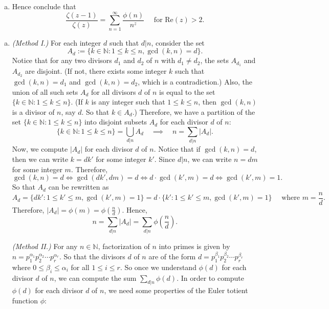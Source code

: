 \documentclass{elegantbook}
\begin{document}
\begin{problemset}[Exercises]
\begin{enumerate}[(a)]
\[            \]
    \item Hence conclude that
            \[
              \frac{\zeta(z-1)}{\zeta(z)} = \sum_{n=1}^{\infty} \frac{\phi(n)}{n^z} \quad \text{ for } \mathrm{Re}(z)>2.
            \]
  \end{enumerate}
  \begin{solution}
    \begin{enumerate}[(a)]
      \item \textit{(Method I.)} For each integer $d$ such that $d|n$, consider the set
      \[
        A_d := \{ k \in \mathbb{N} : 1 \leq k \leq n, \gcd(k,n) = d \}.
      \]
      Notice that for any two divisors $d_1$ and $d_2$ of $n$ with $d_1 \neq d_2$, the sets $A_{d_1}$ and $A_{d_2}$ are disjoint. (If not, there exists some integer $k$ such that $\gcd(k,n) = d_1$ and $\gcd(k,n) = d_2$, which is a contradiction.) Also, the union of all such sets $A_d$ for all divisors $d$ of $n$ is equal to the set $\{ k \in \mathbb{N} : 1 \leq k \leq n \}$. (If $k$ is any integer such that $1 \leq k \leq n$, then $\gcd(k,n)$ is a divisor of $n$, say $d$. So that $k \in A_d$.)
      Therefore, we have a partition of the set $\{ k \in \mathbb{N} : 1 \leq k \leq n \}$ into disjoint subsets $A_d$ for each divisor $d$ of $n$:
      \[
        \{ k \in \mathbb{N} : 1 \leq k \leq n \} = \bigcup_{d|n} A_d \quad \implies \quad n = \sum_{d|n} |A_d|.
      \]
      Now, we compute $|A_d|$ for each divisor $d$ of $n$. Notice that if $\gcd(k,n) = d$, then we can write $k = d k'$ for some integer $k'$. Since $d|n$, we can write $n = d m$ for some integer $m$. Therefore,
      \[
        \gcd(k,n) = d \iff \gcd(d k', d m) = d \iff d \cdot \gcd(k', m) = d \iff \gcd(k', m) = 1.
      \]
      So that $A_d$ can be rewritten as
      \[
        A_d = \{ d k' : 1 \leq k' \leq m, \gcd(k', m) = 1 \}= d \cdot \{ k' : 1 \leq k' \leq m, \gcd(k', m) = 1 \} \quad \text{ where } m = \frac{n}{d}.
      \]
      Therefore, $|A_d| = \phi(m) = \phi\left(\frac{n}{d}\right)$. Hence,
      \[
        n = \sum_{d|n} |A_d| = \sum_{d|n} \phi\left(\frac{n}{d}\right).
      \]
      
      \textit{(Method II.)}
      For any $n \in \mathbb{N}$, factorization of $n$ into primes is given by $n = p_1^{\alpha_1} p_2^{\alpha_2} \cdots p_r^{\alpha_r}$. So that the divisors $d$ of $n$ are of the form $d = p_1^{\beta_1} p_2^{\beta_2} \cdots p_r^{\beta_r}$ where $0 \leq \beta_i \leq \alpha_i$ for all $1 \leq i \leq r$. So once we understand $\phi(d)$ for each divisor $d$ of $n$, we can compute the sum $\sum_{d|n} \phi(d)$.
      In order to compute $\phi(d)$ for each divisor $d$ of $n$, we need some properties of the Euler totient function $\phi$:


\end{enumerate}
\end{solution}
\end{problemset}
\end{document}

